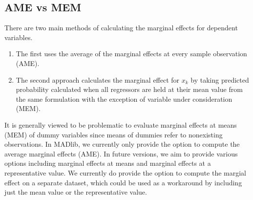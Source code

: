 \subsection{AME vs MEM} %
\label{sub:ame_vs_mem}
 There are two main methods of calculating the marginal effects for dependent variables.
 \begin{enumerate}
   \item The first uses the average of the marginal effects at every sample
   observation (AME).

   \item The second approach calculates the marginal effect for $x_k$ by taking
predicted probability calculated when all regressors are held at their mean
value from the same formulation with the exception of variable under
consideration (MEM).

    \end{enumerate}

It is generally viewed to be problematic to evaluate
marginal effects at means (MEM) of dummy variables since means of dummies refer
to nonexisting observations. In MADlib, we currently only provide the option to
compute the average marginal effects (AME). In future versions, we aim to
provide various options including marginal effects at means and marginal
effects at a representative value. We currently do
provide the option to compute the margial effect on a separate dataset, which
could be used as a workaround by including just the mean value or the representative value.

